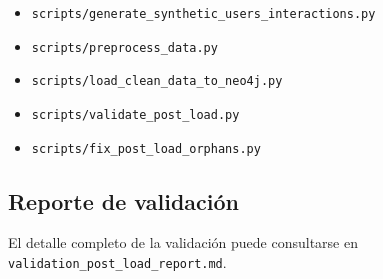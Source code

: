 \documentclass[12pt,a4paper]{article}
\begin{document}
\begin{itemize}
    \item \texttt{scripts/generate\_synthetic\_users\_interactions.py}
    \item \texttt{scripts/preprocess\_data.py}
    \item \texttt{scripts/load\_clean\_data\_to\_neo4j.py}
    \item \texttt{scripts/validate\_post\_load.py}
    \item \texttt{scripts/fix\_post\_load\_orphans.py}
\end{itemize}

\subsection{Reporte de validación}

El detalle completo de la validación puede consultarse en \texttt{validation\_post\_load\_report.md}.
\end{document}
